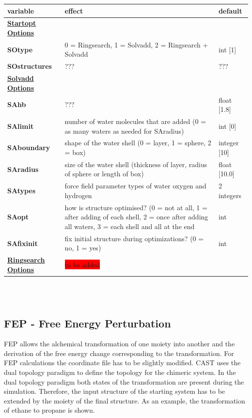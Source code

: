 \documentclass[10pt,a4paper]{article} %
\begin{document}
	\begin{tabularx}{\textwidth}{l|X|X}
		variable & effect & default \\
		\hline
    \textbf{\underline{Startopt Options}} &  &  \\ 
		\textbf{SOtype} & 0 = Ringsearch, 1 = Solvadd, 2 = Ringsearch + Solvadd	& int [1]\\
		\textbf{SOstructures} & ??? & ??? \\
		\hline
		\textbf{\underline{Solvadd Options}} & &  \\
		\textbf{SAhb} & ??? & float [1.8] \\
		\textbf{SAlimit} & number of water molecules that are added (0 = as many waters as needed for SAradius) & int [0] \\
		\textbf{SAboundary} & shape of the water shell (0 = layer, 1 = sphere, 2 = box) & integer [10] \\
		\textbf{SAradius} & size of the water shell (thickness of layer, radius of sphere or length of box) & float [10.0]\\
		\textbf{SAtypes} & force field parameter types of water oxygen and hydrogen & 2 integers \\
		\textbf{SAopt} & how is structure optimised? (0 = not at all, 1 = after adding of each shell, 2 = once after adding all waters, 3 = each shell and all at the end & int \\
		\textbf{SAfixinit} & fix initial structure during optimizations? (0 = no, 1 = yes) & int \\
		\hline
		\textbf{\underline{Ringsearch Options}} & \colorbox{red}{to be added} &  \\ 

		
	\end{tabularx}\\~\\

	\subsection{FEP - Free Energy Perturbation}
	\acf{FEP} allows the alchemical transformation of one moiety into another and the derivation of the free energy change corresponding to the transformation. For \ac{FEP} calculations the coordinate file has to be slightly modified. \ac{CAST} uses the dual topology paradigm to define the topology for the chimeric system. In the dual topology paradigm both states of the transformation are present during the simulation. Therefore, the input structure of the starting system has to be extended by the moiety of the final structure. As an example, the transformation of ethane to propane is shown. \\
\end{document}
